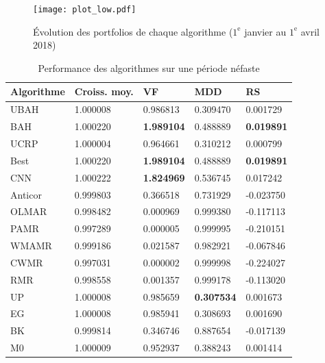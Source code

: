 \documentclass[a4paper, 10pt]{article}
\begin{document}
\begin{figure}[ht!]
\begin{center}
\texttt{[image: plot\_low.pdf]}
\caption{Évolution des portfolios de chaque algorithme ($1^{\text{e}}$ janvier au $1^{\text{e}}$ avril 2018)}
\label{fig:plot_low}
\end{center}
\end{figure}

\begin{center}
\begin{table}[!ht]
\begin{tabularx}{\textwidth}{YYYYY}
\toprule
\textbf{Algorithme} & \textbf{Croiss. moy.} & \textbf{VF} & \textbf{MDD} & \textbf{RS}\\
\midrule
UBAH    & 1.000008 & 0.986813 & 0.309470 &  0.001729 \\
BAH     & 1.000220 & \textbf{1.989104} & 0.488889 &  \textbf{0.019891} \\
UCRP    & 1.000004 & 0.964661 & 0.310212 &  0.000799 \\
Best    & 1.000220 & \textbf{1.989104} & 0.488889 &  \textbf{0.019891} \\
CNN     & 1.000222 & \textbf{1.824969} & 0.536745 &  0.017242 \\
Anticor & 0.999803 & 0.366518 & 0.731929 & -0.023750 \\
OLMAR   & 0.998482 & 0.000969 & 0.999380 & -0.117113 \\
PAMR    & 0.997289 & 0.000005 & 0.999995 & -0.210151 \\
WMAMR   & 0.999186 & 0.021587 & 0.982921 & -0.067846 \\
CWMR    & 0.997031 & 0.000002 & 0.999998 & -0.224027 \\
RMR     & 0.998558 & 0.001357 & 0.999178 & -0.113020 \\
UP      & 1.000008 & 0.985659 & \textbf{0.307534} &  0.001673 \\
EG      & 1.000008 & 0.985941 & 0.308693 &  0.001690 \\
BK      & 0.999814 & 0.346746 & 0.887654 & -0.017139 \\
M0      & 1.000009 & 0.952937 & 0.388243 &  0.001414 \\
\bottomrule
\end{tabularx}
\caption{Performance des algorithmes sur une période néfaste}
\label{tab:perf_low}
\end{table}
\end{center}
\end{document}
